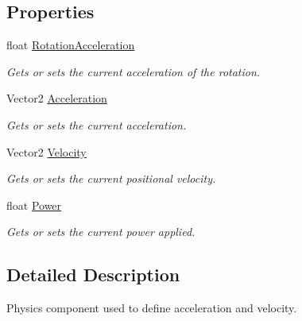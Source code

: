 \subsection*{Properties}
\begin{DoxyCompactItemize}
\item 
float \hyperlink{class_midnight_blue_1_1_engine_1_1_entity_component_1_1_physics_component_a050c56ef4af910de604df29e477d6d3a}{Rotation\+Acceleration}
\begin{DoxyCompactList}\small\item\em Gets or sets the current acceleration of the rotation. \end{DoxyCompactList}\item 
Vector2 \hyperlink{class_midnight_blue_1_1_engine_1_1_entity_component_1_1_physics_component_a6a1ba6cadea7bff8bf8db570fc71ac68}{Acceleration}
\begin{DoxyCompactList}\small\item\em Gets or sets the current acceleration. \end{DoxyCompactList}\item 
Vector2 \hyperlink{class_midnight_blue_1_1_engine_1_1_entity_component_1_1_physics_component_ab6c31525424cbc7cbcc42fc5264d0ef9}{Velocity}
\begin{DoxyCompactList}\small\item\em Gets or sets the current positional velocity. \end{DoxyCompactList}\item 
float \hyperlink{class_midnight_blue_1_1_engine_1_1_entity_component_1_1_physics_component_a0dadbdaae717bce90e7643ec52360d2a}{Power}
\begin{DoxyCompactList}\small\item\em Gets or sets the current power applied. \end{DoxyCompactList}\end{DoxyCompactItemize}


\subsection{Detailed Description}
Physics component used to define acceleration and velocity. 



